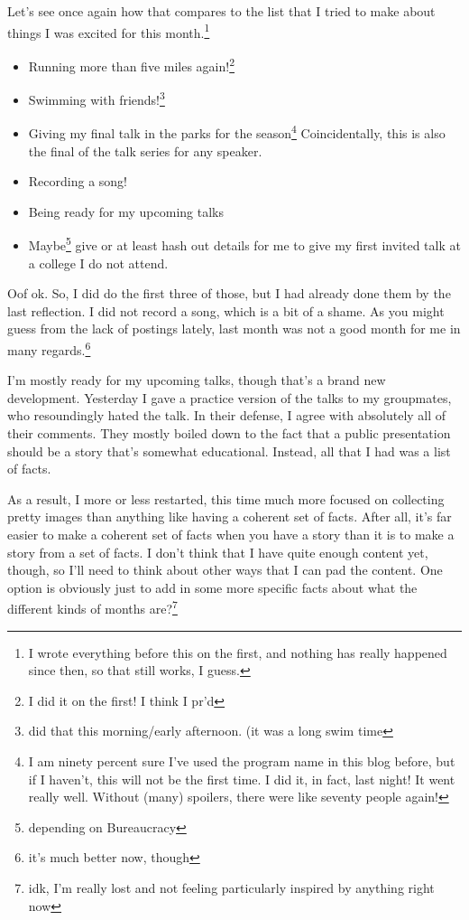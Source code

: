 \documentclass[12pt]{article}[titlepage]
\renewcommand{\,}{\textsuperscript{,}}
\begin{document}
Let's see once again how that compares to the list that I tried to make about things I was excited for this month.\footnote{I wrote everything before this on the first, and nothing has really happened since then, so that still works, I guess.}
\begin{itemize}
\item Running more than five miles again!\footnote{I did it on the first! I think I pr'd}
\item Swimming with friends!\footnote{did that this morning/early afternoon. (it was a long swim time}
\item Giving my final talk in the parks for the season\footnote{I am ninety percent sure I've used the program name in this blog before, but if I haven't, this will not be the first time. I did it, in fact, last night! It went really well. Without (many) spoilers, there were like seventy people again!}
Coincidentally, this is also the final of the talk series for any speaker.
\item Recording a song!
\item Being ready for my upcoming talks
\item Maybe\footnote{depending on Bureaucracy} give or at least hash out details for me to give my first invited talk at a college I do not attend.
\end{itemize}

Oof ok.
So, I did do the first three of those, but I had already done them by the last reflection.
I did not record a song, which is a bit of a shame.
As you might guess from the lack of postings lately, last month was not a good month for me in many regards.\footnote{it's much better now, though}

I'm mostly ready for my upcoming talks, though that's a brand new development.
Yesterday I gave a practice version of the talks to my groupmates, who resoundingly hated the talk.
In their defense, I agree with absolutely all of their comments.
They mostly boiled down to the fact that a public presentation should be a story that's somewhat educational.
Instead, all that I had was a list of facts.

As a result, I more or less restarted, this time much more focused on collecting pretty images than anything like having a coherent set of facts.
After all, it's far easier to make a coherent set of facts when you have a story than it is to make a story from a set of facts.
I don't think that I have quite enough content yet, though, so I'll need to think about other ways that I can pad the content.
One option is obviously just to add in some more specific facts about what the different kinds of months are?\footnote{idk, I'm really lost and not feeling particularly inspired by anything right now}
\end{document}
